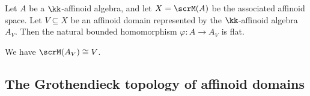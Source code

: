     \begin{proposition}\label{prop:affinoid_domain_is_flat_over_base}
        Let \(A\) be a \(\kk\)-affinoid algebra, and let \(X = \scrM(A)\) be the associated affinoid space.
        Let \(V \subseteq X\) be an affinoid domain represented by the \(\kk\)-affinoid algebra \(A_V\).
        Then the natural bounded homomorphism \(\varphi: A \to A_V\) is flat.

        We have \(\scrM(A_V) \cong V\).
    \end{proposition}


\subsection{The Grothendieck topology of affinoid domains}